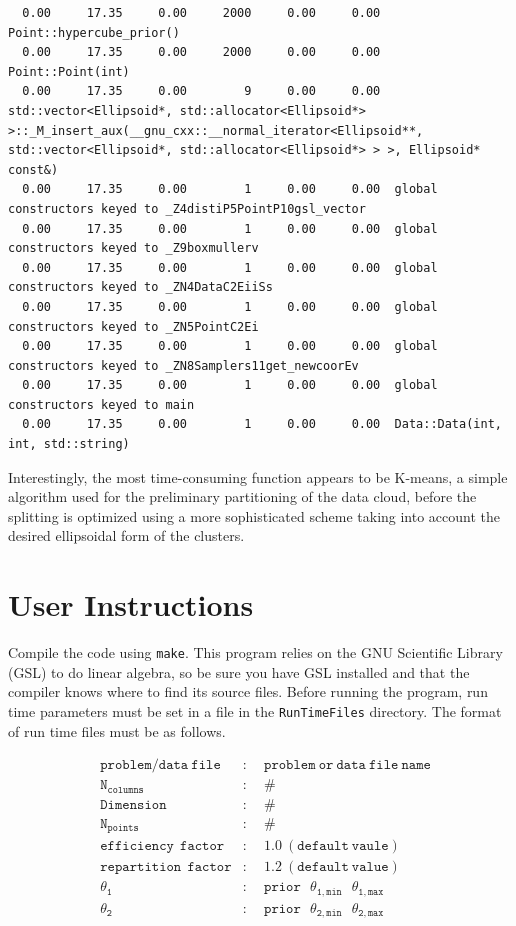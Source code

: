 \documentclass{article}
\def\mtt{\mathtt}
\begin{document}
\begin{verbatim}
  0.00     17.35     0.00     2000     0.00     0.00  Point::hypercube_prior()
  0.00     17.35     0.00     2000     0.00     0.00  Point::Point(int)
  0.00     17.35     0.00        9     0.00     0.00  std::vector<Ellipsoid*, std::allocator<Ellipsoid*> >::_M_insert_aux(__gnu_cxx::__normal_iterator<Ellipsoid**, std::vector<Ellipsoid*, std::allocator<Ellipsoid*> > >, Ellipsoid* const&)
  0.00     17.35     0.00        1     0.00     0.00  global constructors keyed to _Z4distiP5PointP10gsl_vector
  0.00     17.35     0.00        1     0.00     0.00  global constructors keyed to _Z9boxmullerv
  0.00     17.35     0.00        1     0.00     0.00  global constructors keyed to _ZN4DataC2EiiSs
  0.00     17.35     0.00        1     0.00     0.00  global constructors keyed to _ZN5PointC2Ei
  0.00     17.35     0.00        1     0.00     0.00  global constructors keyed to _ZN8Samplers11get_newcoorEv
  0.00     17.35     0.00        1     0.00     0.00  global constructors keyed to main
  0.00     17.35     0.00        1     0.00     0.00  Data::Data(int, int, std::string)
\end{verbatim}
Interestingly, the most time-consuming function appears to be K-means, a simple algorithm used for the preliminary partitioning of the data cloud, before the splitting is optimized using a more sophisticated scheme taking into account the desired ellipsoidal form of the clusters.
\section{User Instructions}
Compile the code using {\tt make}.  This program relies on the GNU Scientific Library (GSL) to do linear algebra, so be sure  you have GSL installed and that the compiler knows where to find its source files. Before running the program, run time parameters must be set in a file in the {\tt RunTimeFiles} directory. The format of run time files must be as follows. 

\begin{align*}
&\mtt{problem/data \ file}    &:& \ \ \mtt{problem \ or \ data \ file \ name}\\
&\mtt{N_{columns}}  	     &:& \ \ \mtt{\#}\\       
&\mtt{Dimension} 	            &:& \ \ \mtt{\# }\\
&\mtt{N_{points}}                &:& \ \ \mtt{\#}\\
&\mtt{efficiency \  \ factor}   &:& \ \ \mtt{1.0 \ (default \ vaule)}\\  
&\mtt{repartition \  \ factor}  &:& \ \ \mtt{1.2 \ (default \ value)}\\
&\mtt{\theta_1}                    &:& \ \ \mtt{prior \  \ \  \theta_{1,min}  \  \ \ \theta_{1,max}}\\     
&\mtt{\theta_2}                    &:& \ \ \mtt{prior \  \  \ \theta_{2,min}  \  \ \  \theta_{2,max}}\\     
\end{align*}
\end{document}

